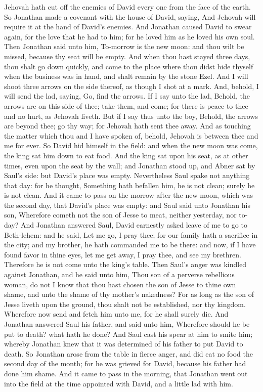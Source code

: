 Jehovah hath cut off the enemies of David every one from the face of the earth. So Jonathan made a covenant with the house of David, saying, And Jehovah will require it at the hand of David’s enemies.  And Jonathan caused David to swear again, for the love that he had to him; for he loved him as he loved his own soul. Then Jonathan said unto him, To-morrow is the new moon: and thou wilt be missed, because thy seat will be empty. And when thou hast stayed three days, thou shalt go down quickly, and come to the place where thou didst hide thyself when the business was in hand, and shalt remain by the stone Ezel. And I will shoot three arrows on the side thereof, as though I shot at a mark. And, behold, I will send the lad, saying, Go, find the arrows. If I say unto the lad, Behold, the arrows are on this side of thee; take them, and come; for there is peace to thee and no hurt, as Jehovah liveth. But if I say thus unto the boy, Behold, the arrows are beyond thee; go thy way; for Jehovah hath sent thee away. And as touching the matter which thou and I have spoken of, behold, Jehovah is between thee and me for ever.  So David hid himself in the field: and when the new moon was come, the king sat him down to eat food. And the king sat upon his seat, as at other times, even upon the seat by the wall; and Jonathan stood up, and Abner sat by Saul’s side: but David’s place was empty. Nevertheless Saul spake not anything that day: for he thought, Something hath befallen him, he is not clean; surely he is not clean. And it came to pass on the morrow after the new moon, which was the second day, that David’s place was empty: and Saul said unto Jonathan his son, Wherefore cometh not the son of Jesse to meat, neither yesterday, nor to-day? And Jonathan answered Saul, David earnestly asked leave of me to go to Beth-lehem: and he said, Let me go, I pray thee; for our family hath a sacrifice in the city; and my brother, he hath commanded me to be there: and now, if I have found favor in thine eyes, let me get away, I pray thee, and see my brethren. Therefore he is not come unto the king’s table.  Then Saul’s anger was kindled against Jonathan, and he said unto him, Thou son of a perverse rebellious woman, do not I know that thou hast chosen the son of Jesse to thine own shame, and unto the shame of thy mother’s nakedness? For as long as the son of Jesse liveth upon the ground, thou shalt not be established, nor thy kingdom. Wherefore now send and fetch him unto me, for he shall surely die. And Jonathan answered Saul his father, and said unto him, Wherefore should he be put to death? what hath he done? And Saul cast his spear at him to smite him; whereby Jonathan knew that it was determined of his father to put David to death. So Jonathan arose from the table in fierce anger, and did eat no food the second day of the month; for he was grieved for David, because his father had done him shame.  And it came to pass in the morning, that Jonathan went out into the field at the time appointed with David, and a little lad with him. 